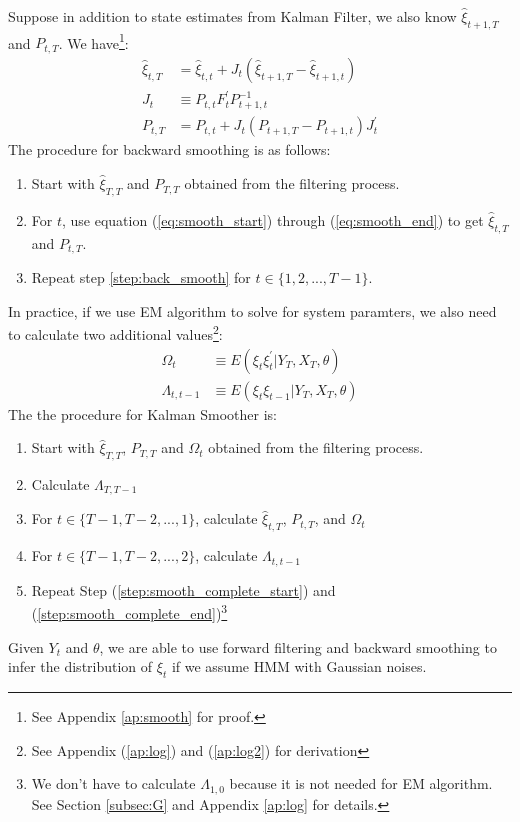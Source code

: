 \documentclass[12pt]{article}
\newenvironment{boenumerate}
    {\begin{enumerate}\renewcommand\labelenumi{\textbf\theenumi}}
    {\end{enumerate}}
\numberwithin{equation}{section}
\begin{document}
Suppose in addition to state estimates from Kalman Filter, we also know $\hat{\xi}_{t+1,T}$ and $P_{t,T}$. We have\footnote{See Appendix \ref{ap:smooth} for proof.}:
\begin{align}
    \hat{\xi}_{t,T} &= \hat{\xi}_{t,t} + J_t(\hat{\xi}_{t+1,T}-\hat{\xi}_{t+1,t}) \label{eq:smooth_start} \\
    J_t & \equiv P_{t,t}F_t^{'}P_{t+1,t}^{-1} \\
    P_{t,T} &= P_{t,t} + J_t(P_{t+1,T}-P_{t+1,t})J_t^{'} \label{eq:smooth_end}
\end{align}
The procedure for backward smoothing is as follows:
\begin{boenumerate}
    \item Start with $\hat{\xi}_{T,T}$ and $P_{T,T}$ obtained from the filtering process.
    \item \label{step:back_smooth} For $t$, use equation (\ref{eq:smooth_start}) through (\ref{eq:smooth_end}) to get $\hat{\xi}_{t,T}$ and $P_{t,T}$.
    \item Repeat step \ref{step:back_smooth} for $t \in \{1,2,...,T-1\}$.
\end{boenumerate}
In practice, if we use EM algorithm to solve for system paramters, we also need to calculate two additional values\footnote{See Appendix (\ref{ap:log}) and (\ref{ap:log2}) for derivation}:
\begin{align*}
    \Omega_t &\equiv E(\xi_t\xi_t^{'}|Y_T, X_T, \theta) \nonumber \\
    \Lambda_{t,t-1} &\equiv E(\xi_t\xi_{t-1}|Y_T,X_T, \theta) \nonumber
\end{align*}
The the procedure for Kalman Smoother is:
\begin{boenumerate}
    \item Start with $\hat{\xi}_{T,T}$, $P_{T,T}$ and $\Omega_t$ obtained from the filtering process. 
    \item Calculate $\Lambda_{T, T-1}$
    \item \label{step:smooth_complete_start} For $t\in\{T-1, T-2, ..., 1\}$, calculate $\hat{\xi}_{t,T}$, $P_{t,T}$, and $\Omega_t$
    \item \label{step:smooth_complete_end} For $t\in\{T-1, T-2, ..., 2\}$, calculate $\Lambda_{t,t-1}$
    \item Repeat Step (\ref{step:smooth_complete_start}) and (\ref{step:smooth_complete_end})\footnote{We don't have to calculate $\Lambda_{1,0}$ because it is not needed for EM algorithm. See Section \ref{subsec:G} and Appendix \ref{ap:log} for details.}
\end{boenumerate}
Given $Y_t$ and $\theta$, we are able to use forward filtering and backward smoothing to infer the distribution of $\xi_t$ if we assume HMM with Gaussian noises. 
\end{document}
